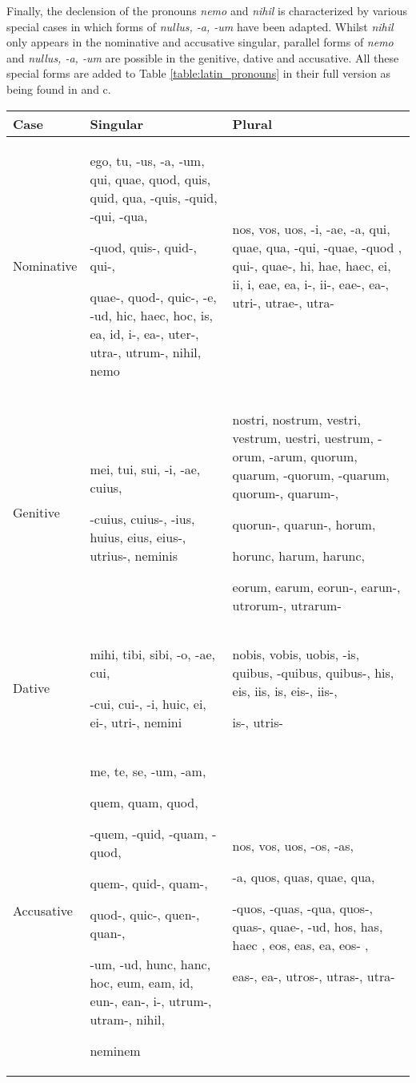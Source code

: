 \documentclass[11pt,a4paper,twoside,openright]{scrbook}
\begin{document}
Finally, the declension of the pronouns \textit{nemo} and \textit{nihil} is characterized by various special cases in which forms of \textit{nullus, -a, -um} have been adapted. Whilst \textit{nihil} only appears in the nominative and accusative singular, parallel forms of \textit{nemo} and \textit{nullus, -a, -um} are possible in the genitive, dative and accusative. All these special forms are added to Table \ref{table:latin_pronouns} in their full version as being found in \citet{rubenbauer1995lat} and c\citet{touratier2013lat}.


\begin{table}[!htbp]
\centering

\begin{tabular}{|p{}||p{5cm}|p{5cm}|}
 \hline
 Case & Singular & Plural \\ [1ex]
 \hline\hline
 Nominative & ego, tu, -us, -a, -um, qui, quae, quod, quis, quid, qua, -quis, -quid, -qui, -qua, \par -quod, quis-, quid-, qui-, \par quae-, quod-, quic-, -e, -ud, hic, haec, hoc, is, ea, id, i-, ea-, uter-, utra-, utrum-, nihil, nemo  & nos, vos, uos, -i, -ae, -a, qui, quae, qua, -qui, -quae, -quod , qui-, quae-, hi, hae, haec, ei, ii, i, eae, ea, i-, ii-, eae-, ea-, utri-, utrae-, utra- \\ [1ex]
 \hline
 Genitive & mei, tui, sui, -i, -ae, cuius,  \par -cuius, cuius-, -ius, huius, eius, eius-, utrius-, neminis & nostri, nostrum, vestri, vestrum, uestri, uestrum, -orum, -arum, quorum, quarum, -quorum, -quarum, quorum-, quarum-, \par quorun-, quarun-, horum, \par horunc, harum, harunc, \par eorum, earum, eorun-, earun-, utrorum-, utrarum- \\ [1ex]
 \hline 
 Dative & mihi, tibi, sibi, -o, -ae, cui, \par -cui, cui-, -i, huic, ei, ei-, utri-, nemini & nobis, vobis, uobis, -is, quibus, -quibus, quibus-, his, eis, iis, is, eis-, iis-, \par is-, utris-  \\ [1ex]
 \hline
 Accusative & me, te, se, -um, -am, \par quem, quam, quod, \par -quem, -quid, -quam, -quod, \par quem-, quid-, quam-, \par quod-, quic-, quen-, quan-, \par -um, -ud, hunc, hanc, hoc, eum, eam, id, eun-, ean-, i-, utrum-, utram-, nihil, \par neminem & nos, vos, uos, -os, -as, \par -a, quos, quas, quae, qua, \par -quos, -quas, -qua, quos-, quas-, quae-, -ud, hos, has, haec , eos, eas, ea, eos- , \par eas-, ea-, utros-, utras-, utra-  \\ [1ex]

\end{tabular}
\end{table}
\end{document}
